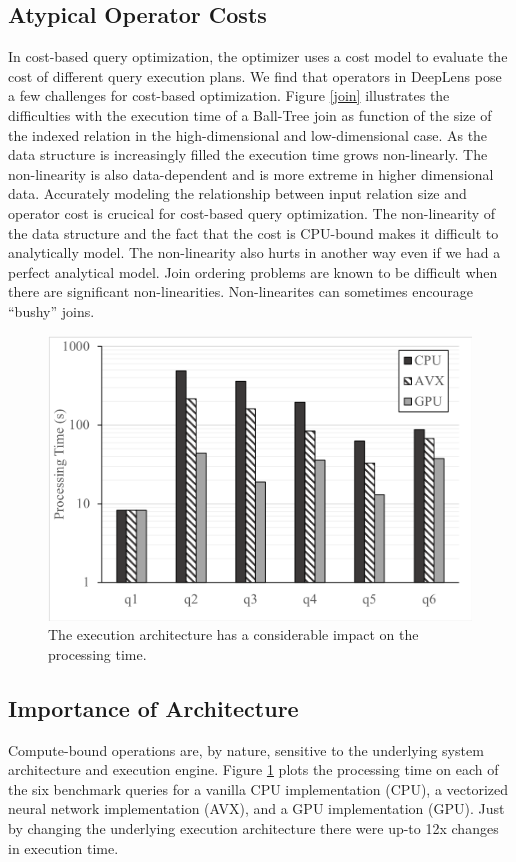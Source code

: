 \subsection{Atypical Operator Costs}
In cost-based query optimization, the optimizer uses a cost model to evaluate the cost of different query execution plans. We find that operators in \textsf{DeepLens} pose a few challenges for cost-based optimization. Figure \ref{join} illustrates the difficulties with the execution time of a Ball-Tree join as function of the size of the indexed relation in the high-dimensional and low-dimensional case. As the data structure is increasingly filled the execution time grows non-linearly. The non-linearity is also data-dependent and is more extreme in higher dimensional data. Accurately modeling the relationship between input relation size and operator cost is crucical for cost-based query optimization. The non-linearity of the data structure and the fact that the cost is CPU-bound makes it difficult to analytically model.
The non-linearity also hurts in another way even if we had a perfect analytical model. Join ordering problems are known to be difficult when there are significant non-linearities. Non-linearites can sometimes encourage ``bushy'' joins.

\begin{figure}[t]
\centering
 \includegraphics[width=\columnwidth]{figures/build.png}
 \caption{The execution architecture has a considerable impact on the processing time.  \label{build} }
\end{figure}

\subsection{Importance of Architecture}
Compute-bound operations are, by nature, sensitive to the underlying system architecture and execution engine. Figure \ref{build} plots the processing time on each of the six benchmark queries for a vanilla CPU implementation (CPU), a vectorized neural network implementation (AVX), and a GPU implementation (GPU). Just by changing the underlying execution architecture there were up-to 12x changes in execution time. 


